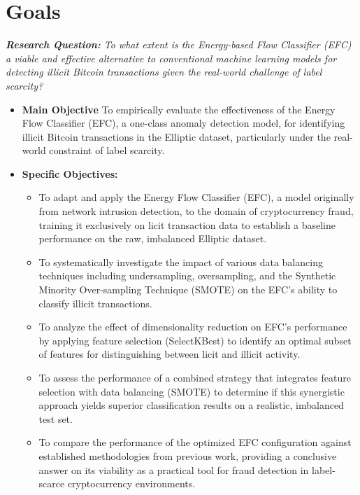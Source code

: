 \section{Goals}
\textit{\textbf{Research Question:} To what extent is the Energy-based Flow Classifier (EFC) a viable and effective alternative
to conventional machine learning models for detecting illicit Bitcoin transactions given the real-world challenge of label scarcity?}

\begin{itemize}
    \item \textbf{Main Objective }{To empirically evaluate the effectiveness of the Energy Flow Classifier (EFC), a one-class anomaly
    detection model, for identifying illicit Bitcoin transactions in the Elliptic dataset, particularly under the real-world
    constraint of label scarcity.}
    \item[] \textbf{Specific Objectives:}
    \begin{itemize}
        \item To adapt and apply the Energy Flow Classifier (EFC), a model originally from network intrusion detection,
        to the domain of cryptocurrency fraud, training it exclusively on licit transaction data to establish a baseline
        performance on the raw, imbalanced Elliptic dataset.
        \item To systematically investigate the impact of various data balancing techniques including undersampling, oversampling,
        and the Synthetic Minority Over-sampling Technique (SMOTE) on the EFC's ability to classify illicit transactions.
        \item To analyze the effect of dimensionality reduction on EFC's performance by applying feature selection (SelectKBest)
        to identify an optimal subset of features for distinguishing between licit and illicit activity.
        \item To assess the performance of a combined strategy that integrates feature selection with data balancing (SMOTE)
        to determine if this synergistic approach yields superior classification results on a realistic, imbalanced test set.
        \item To compare the performance of the optimized EFC configuration against established methodologies from previous
        work, providing a conclusive answer on its viability as a practical tool for fraud detection in label-scarce cryptocurrency
        environments.
    \end{itemize}
\end{itemize}
